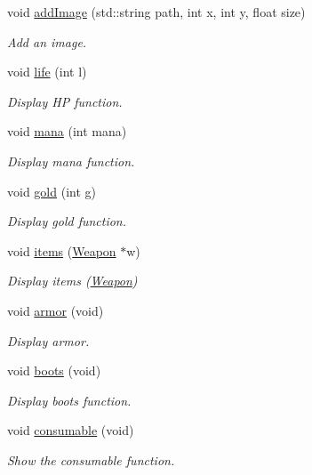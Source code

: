 \begin{DoxyCompactItemize}
void \hyperlink{class_h_u_d_window_aee140416af161a6d8acc2b0c83370088}{add\-Image} (std\-::string path, int x, int y, float size)
\begin{DoxyCompactList}\small\item\em Add an image. \end{DoxyCompactList}\item 
void \hyperlink{class_h_u_d_window_a8fc917fbfae792d046e90448c963100a}{life} (int l)
\begin{DoxyCompactList}\small\item\em Display H\-P function. \end{DoxyCompactList}\item 
void \hyperlink{class_h_u_d_window_a6eb79b572849709a329e65ed2afd2e9e}{mana} (int mana)
\begin{DoxyCompactList}\small\item\em Display mana function. \end{DoxyCompactList}\item 
void \hyperlink{class_h_u_d_window_a4eb34de71e2ea671f637381ac255edab}{gold} (int g)
\begin{DoxyCompactList}\small\item\em Display gold function. \end{DoxyCompactList}\item 
void \hyperlink{class_h_u_d_window_a9edf25a0b1cf568aa3f338281d81d99a}{items} (\hyperlink{class_weapon}{Weapon} $\ast$w)
\begin{DoxyCompactList}\small\item\em Display items (\hyperlink{class_weapon}{Weapon}) \end{DoxyCompactList}\item 
void \hyperlink{class_h_u_d_window_a1c6965adb9fdd22b230d20b26fef5ac0}{armor} (void)
\begin{DoxyCompactList}\small\item\em Display armor. \end{DoxyCompactList}\item 
void \hyperlink{class_h_u_d_window_acd4fdbfd1c2562384b84d3bcda80fea1}{boots} (void)
\begin{DoxyCompactList}\small\item\em Display boots function. \end{DoxyCompactList}\item 
void \hyperlink{class_h_u_d_window_a378bc8269cacb151f68cfb37114e0c38}{consumable} (void)
\begin{DoxyCompactList}\small\item\em Show the consumable function. \end{DoxyCompactList}\item 

\end{DoxyCompactItemize}

